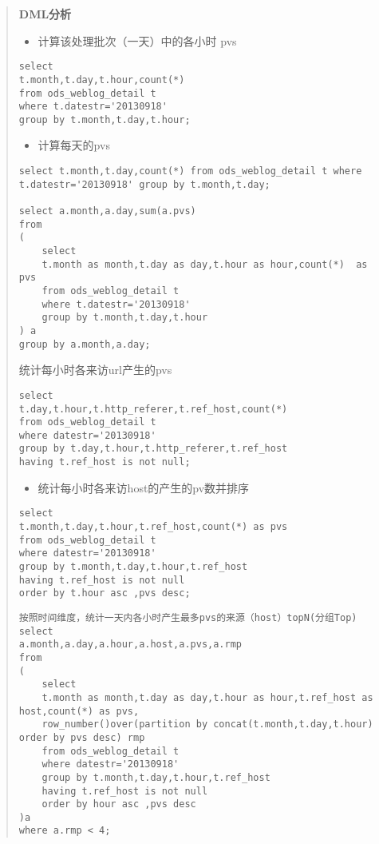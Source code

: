 \begin{quote}
\textbf{DML分析}

\begin{itemize}
\item
  计算该处理批次（一天）中的各小时 pvs
\end{itemize}

\begin{verbatim}
select 
t.month,t.day,t.hour,count(*)
from ods_weblog_detail t
where t.datestr='20130918'
group by t.month,t.day,t.hour;
\end{verbatim}

\begin{itemize}
\item
  计算每天的pvs
\end{itemize}

\begin{verbatim}
select t.month,t.day,count(*) from ods_weblog_detail t where t.datestr='20130918' group by t.month,t.day;

select a.month,a.day,sum(a.pvs)
from 
(
    select 
    t.month as month,t.day as day,t.hour as hour,count(*)  as pvs
    from ods_weblog_detail t
    where t.datestr='20130918'
    group by t.month,t.day,t.hour
) a 
group by a.month,a.day;
\end{verbatim}

统计每小时各来访url产生的pvs

\begin{verbatim}
select 
t.day,t.hour,t.http_referer,t.ref_host,count(*)
from ods_weblog_detail t
where datestr='20130918'
group by t.day,t.hour,t.http_referer,t.ref_host
having t.ref_host is not null;
\end{verbatim}

\begin{itemize}
\item
  统计每小时各来访host的产生的pv数并排序
\end{itemize}

\begin{verbatim}
select 
t.month,t.day,t.hour,t.ref_host,count(*) as pvs
from ods_weblog_detail t
where datestr='20130918'
group by t.month,t.day,t.hour,t.ref_host
having t.ref_host is not null
order by t.hour asc ,pvs desc;
\end{verbatim}

\begin{verbatim}
按照时间维度，统计一天内各小时产生最多pvs的来源（host）topN(分组Top)
select 
a.month,a.day,a.hour,a.host,a.pvs,a.rmp
from
(
    select 
    t.month as month,t.day as day,t.hour as hour,t.ref_host as host,count(*) as pvs,
    row_number()over(partition by concat(t.month,t.day,t.hour) order by pvs desc) rmp
    from ods_weblog_detail t
    where datestr='20130918'
    group by t.month,t.day,t.hour,t.ref_host
    having t.ref_host is not null
    order by hour asc ,pvs desc
)a 
where a.rmp < 4;
\end{verbatim}


\end{quote}
